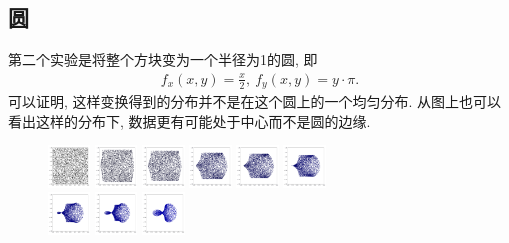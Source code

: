 \documentclass[lang=cn,11pt]{elegantpaper}
\begin{document}
\subsection{圆}
第二个实验是将整个方块变为一个半径为1的圆, 即
\begin{align*}
	f_x(x,y)=\frac{x}{2},\ f_y(x,y)=y\cdot\pi.
\end{align*}
可以证明, 这样变换得到的分布并不是在这个圆上的一个均匀分布. 从图上也可以看出这样的分布下, 数据更有可能处于中心而不是圆的边缘. 
\begin{figure}[htbp]
  \centering
  \includegraphics[width=0.1\textwidth]{circle_1_1}
  \includegraphics[width=0.1\textwidth]{circle_1_2}
  \includegraphics[width=0.1\textwidth]{circle_1_3}
  \includegraphics[width=0.1\textwidth]{circle_1_4}
  \includegraphics[width=0.1\textwidth]{circle_1_5}
  \includegraphics[width=0.1\textwidth]{circle_1_6}\\
  \includegraphics[width=0.1\textwidth]{circle_1_7}
  \includegraphics[width=0.1\textwidth]{circle_1_71}
  \includegraphics[width=0.1\textwidth]{circle_1_8}

\end{figure}
\end{document}
